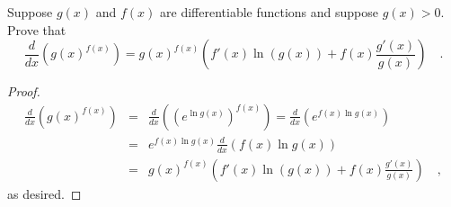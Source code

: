 \begin{frame}
\begin{example}
Suppose $g(x)$ and $f(x)$ are differentiable functions and suppose $g(x)>0$. Prove that
\[
\frac{d}{dx} \left(g(x)^{f(x)} \right)=g(x)^{f(x)} \left( f'(x) \ln (g(x)) + f(x)\frac{g'(x)}{g(x)}\right) \quad .
\]
\end{example}
\begin{proof}
\[
\begin{array}{rcl}
\displaystyle \frac{d}{dx} \left(g(x)^{f(x)} \right)&=&\displaystyle \frac{d}{dx} \left( \left(e^{\ln g(x)}\right)^{f(x)} \right)=\frac{d}{dx} \left(e^{f(x)\ln g(x)} \right)\\
&=&\displaystyle e^{f(x)\ln g(x)} \frac{d}{dx} (f(x) \ln g(x)) \\
&=&\displaystyle 
g(x)^{f(x)} \left( f'(x) \ln (g(x)) + f(x)\frac{g'(x)}{g(x)}\right)\quad ,
\end{array}
\]
as desired.
\end{proof}
\end{frame}
